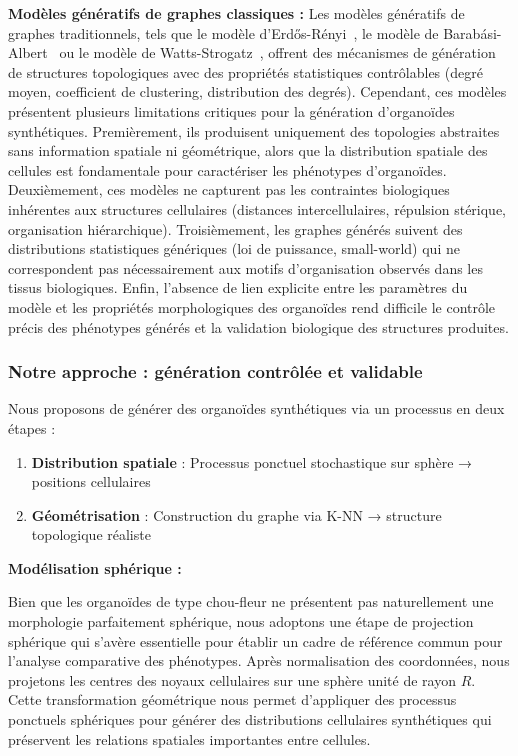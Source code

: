 \textbf{Modèles génératifs de graphes classiques :}
Les modèles génératifs de graphes traditionnels, tels que le modèle d'Erdős-Rényi~\cite{Erdos1959}, le modèle de Barabási-Albert~\cite{Barabasi1999} ou le modèle de Watts-Strogatz~\cite{Watts1998}, offrent des mécanismes de génération de structures topologiques avec des propriétés statistiques contrôlables (degré moyen, coefficient de clustering, distribution des degrés). Cependant, ces modèles présentent plusieurs limitations critiques pour la génération d'organoïdes synthétiques. Premièrement, ils produisent uniquement des topologies abstraites sans information spatiale ni géométrique, alors que la distribution spatiale des cellules est fondamentale pour caractériser les phénotypes d'organoïdes. Deuxièmement, ces modèles ne capturent pas les contraintes biologiques inhérentes aux structures cellulaires (distances intercellulaires, répulsion stérique, organisation hiérarchique). Troisièmement, les graphes générés suivent des distributions statistiques génériques (loi de puissance, small-world) qui ne correspondent pas nécessairement aux motifs d'organisation observés dans les tissus biologiques. Enfin, l'absence de lien explicite entre les paramètres du modèle et les propriétés morphologiques des organoïdes rend difficile le contrôle précis des phénotypes générés et la validation biologique des structures produites.

\subsubsection{Notre approche : génération contrôlée et validable}

Nous proposons de générer des organoïdes synthétiques via un processus en deux étapes :
\begin{enumerate}
    \item \textbf{Distribution spatiale} : Processus ponctuel stochastique sur sphère → positions cellulaires
    \item \textbf{Géométrisation} : Construction du graphe via K-NN → structure topologique réaliste
\end{enumerate}

\textbf{Modélisation sphérique :}

Bien que les organoïdes de type chou-fleur ne présentent pas naturellement une morphologie parfaitement sphérique, nous adoptons une étape de projection sphérique qui s'avère essentielle pour établir un cadre de référence commun pour l'analyse comparative des phénotypes. Après normalisation des coordonnées, nous projetons les centres des noyaux cellulaires sur une sphère unité de rayon $R$. Cette transformation géométrique nous permet d'appliquer des processus ponctuels sphériques pour générer des distributions cellulaires synthétiques qui préservent les relations spatiales importantes entre cellules.

